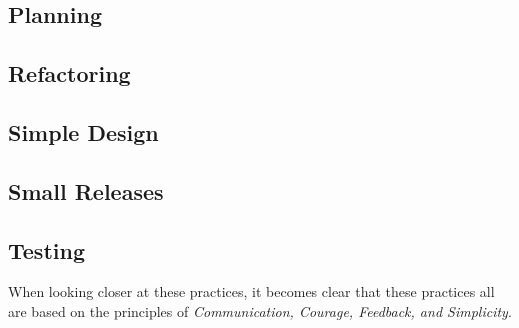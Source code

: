 \subsection{Planning}

\subsection{Refactoring}

\subsection{Simple Design}

\subsection{Small Releases}

\subsection{Testing}













When looking closer at these practices, it becomes clear that these practices all are based on the principles of \textit{Communication, Courage, Feedback, and Simplicity}.